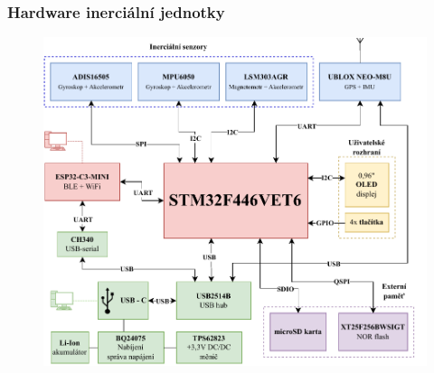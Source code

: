 \documentclass[%
  12pt,       				%
	t,                  %
	aspectratio=1610,   %
	unicode,						%
]{beamer}				    	%
\begin{document}
\begin{frame} 
	\frametitle{Hardware inerciální jednotky}
	
			\begin{figure}%
				\centering
				
				\includegraphics[width=0.62\columnwidth]{obrazky/IMUnav_H00_block}
			\end{figure}
	
\end{frame} 
\end{document}
